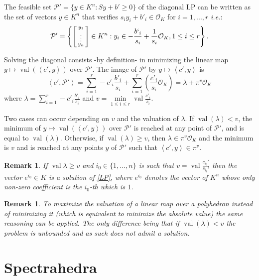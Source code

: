 \documentclass[a4paper,12pt]{article}
\newtheorem{remark}[theorem]{Remark}
\newcommand{\PP}{\mathcal{P}}
\DeclareMathOperator{\val}{val}
\newcommand{\OK}{\mathcal{O}_K}
\begin{document}
The feasible set $\PP' = \{y \in K^n : Sy+b' \geq 0\}$ of the diagonal LP can be written as the set of vectors
$y \in K^n$ that verifies $s_i y_i + b'_i \in \OK$ for $i=1,...,r$ {\it i.e.}:
$$
\PP' = \left\{\left[\begin{smallmatrix} y_1\\ \vdots\\ y_n \end{smallmatrix}\right] \in K^n :
y_i \in -\frac{b`_i}{s_i} + \frac{1}{s_i} \OK, 1\le i\le r\right\}.
$$

Solving the diagonal  consists -by definition- in minimizing the linear map $y \mapsto \val\left(\left\langle
c',y \right\rangle\right)$ over $\PP'$. The image of $\PP'$ by $y \mapsto \left\langle c',y \right\rangle$ is
\[
\left\langle c',\PP' \right\rangle = \sum_{i=1}^r -c'_i \frac{b'_i}{s_i} + \sum_{i=1}^r\left( \frac{c'_i}{s_{i}} \OK \right) = \lambda + \pi^{v} \OK
\]
where $\lambda = \sum_{i=1}^r -c'_i \frac{b'_i}{s_i}$ and $v = \min\limits_{1\le i\le r} \val \frac{c'_{i}}{s_{i}} $.

Two cases can occur depending on $v$ and the valuation of $\lambda$.
If $\val(\lambda) < v$, the minimum of $y\mapsto \val\left(\left\langle c',y \right\rangle\right)$ over $\PP'$
  is reached at any point of $\PP'$, and is equal to $\val(\lambda)$.
  Otherwise, if $\val(\lambda) \ge v$, then $\lambda \in \pi^{v} \OK$ and the minimum is $v$ and is reached at any points $y$
  of $\PP'$ such that $\left<c',y \right> \in \pi^v$.

\begin{remark}
	If $\val \lambda \ge v$ and $i_0 \in \{1,\ldots, n\} $ is such that $v = \val \frac{c_{i_0}'}{s_{i_0}²} $ 
  then the vector $e^{i_0} \in K$ is a solution of \ref{LP}, 
  where $e^{i_0}$ denotes the vector of $K^n$ whose only non-zero coefficient is the $i_0$-th which is $1$.
\end{remark}

\begin{remark}
To maximize the valuation of a linear map over a polyhedron instead of minimizing it 
(which is equivalent to minimize the absolute value) the same reasoning can be applied. 
The only difference being that if $\val\left( \lambda\right) < v$ the problem is unbounded and 
as such does not admit a solution. 
\end{remark}


\section{Spectrahedra}
\end{document}
